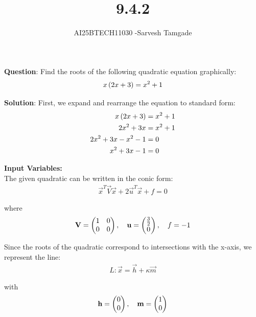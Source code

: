 \documentclass[journal]{IEEEtran}
\begin{document}

\vspace{3cm}

\title{9.4.2}
\author{AI25BTECH11030 -Sarvesh Tamgade}
{\let\newpage\relax\maketitle}

\renewcommand{\thefigure}{\theenumi}
\renewcommand{\thetable}{\theenumi}
\setlength{\intextsep}{10pt} 


\renewcommand{\thetable}{\theenumi}


\textbf{Question}:
Find the roots of the following quadratic equation graphically:
 \begin{align}
  x\left(2x + 3\right) = x^2 + 1
 \end{align}

\textbf{Solution}:  
First, we expand and rearrange the equation to standard form:
\begin{align}
x\left(2x + 3\right) &= x^2 + 1\\
2x^2 + 3x &= x^2 + 1\\
2x^2 + 3x - x^2 - 1 &= 0\\
x^2 + 3x - 1 &= 0
\end{align}

\textbf{Input Variables:  }\\
The given quadratic can be written in the conic form:
\begin{align}
\vec{x}^T\vec{V}\vec{x} + 2\vec{u}^T\vec{x} + f = 0
\end{align}

where
\begin{align}
\mathbf{V} = \begin{pmatrix}1 & 0 \\ 0 & 0\end{pmatrix}, \quad \mathbf{u} = \begin{pmatrix}\frac{3}{2} \\ 0\end{pmatrix}, \quad f = -1
\end{align}

Since the roots of the quadratic correspond to intersections with the x-axis, we represent the line:
\begin{align}
L: \vec{x} = \vec{h} + \kappa\vec{m}
\end{align}

with
\begin{align}
\mathbf{h} = \begin{pmatrix}0 \\ 0\end{pmatrix}, \quad \mathbf{m} = \begin{pmatrix}1 \\ 0\end{pmatrix}
\end{align}
\end{document}
